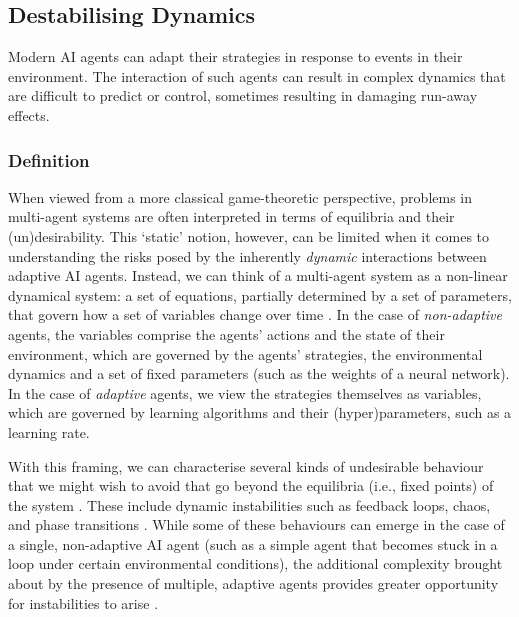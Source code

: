 \subsection{Destabilising Dynamics}
\label{sec:destabilising_dynamics}

Modern AI agents can adapt their strategies in response to events in their environment. The interaction of such agents can result in complex dynamics that are difficult to predict or control, sometimes resulting in damaging run-away effects.

\subsubsection{Definition} 

When viewed from a more classical game-theoretic perspective, problems in multi-agent systems are often interpreted in terms of equilibria and their (un)desirability.
This `static' notion, however, can be limited when it comes to understanding the risks posed by the inherently \emph{dynamic} interactions between adaptive AI agents.
Instead, we can think of a multi-agent system as a non-linear dynamical system: a set of equations, partially determined by a set of parameters, that govern how a set of variables change over time \citep{papadimitriou2019game,BloembergenEtAl2015,Balduzzi2018,barfuss2022dynamical}. 
In the case of \emph{non-adaptive} agents, the variables comprise the agents' actions and the state of their environment, which are governed by the agents' strategies, the environmental dynamics and a set of fixed parameters (such as the weights of a neural network).
In the case of \emph{adaptive} agents, we view the strategies themselves as variables, which are governed by learning algorithms and their (hyper)parameters, such as a learning rate.

With this framing, we can characterise several kinds of undesirable behaviour that we might wish to avoid that go beyond the equilibria (i.e., fixed points) of the system \citep{Mogul2006}.
These include dynamic instabilities such as feedback loops, 
chaos, and phase transitions \citep{Gleick1998,BarfussEtAl2024}.
While some of these behaviours can emerge in the case of a single, non-adaptive AI agent (such as a simple agent that becomes stuck in a loop under certain environmental conditions), the additional complexity brought about by the presence of multiple, adaptive agents provides greater opportunity for instabilities to arise \citep{Sanders2018,Cheung2020,Bielawski2021,chotibut2020route,Piliouras2022}.


